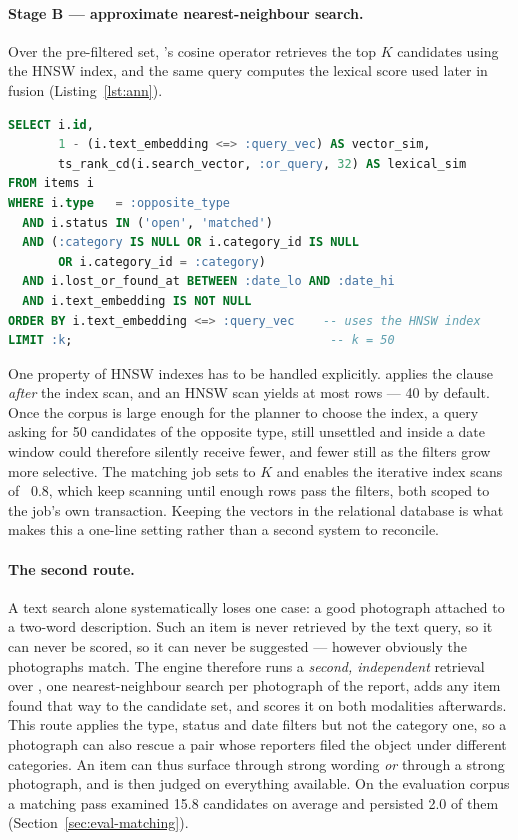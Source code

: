 \paragraph{Stage B --- approximate nearest-neighbour search.} Over the
pre-filtered set, 's cosine operator \code{<=>} retrieves the top
$K$ candidates using the HNSW index, and the same query computes the lexical
score used later in fusion (Listing~\ref{lst:ann}).

\begin{lstlisting}[language=SQL,caption={Candidate retrieval on the text route: filters, vector search and lexical score in one query},label={lst:ann}]
SELECT i.id,
       1 - (i.text_embedding <=> :query_vec) AS vector_sim,
       ts_rank_cd(i.search_vector, :or_query, 32) AS lexical_sim
FROM items i
WHERE i.type   = :opposite_type
  AND i.status IN ('open', 'matched')
  AND (:category IS NULL OR i.category_id IS NULL
       OR i.category_id = :category)
  AND i.lost_or_found_at BETWEEN :date_lo AND :date_hi
  AND i.text_embedding IS NOT NULL
ORDER BY i.text_embedding <=> :query_vec    -- uses the HNSW index
LIMIT :k;                                    -- k = 50
\end{lstlisting}

One property of HNSW indexes has to be handled explicitly. 
applies the  clause \emph{after} the index scan, and an HNSW scan
yields at most  rows --- 40 by default. Once the corpus is
large enough for the planner to choose the index, a query asking for 50
candidates of the opposite type, still unsettled and inside a date window could
therefore silently receive fewer, and fewer still as the filters grow more
selective. The matching job sets  to $K$ and enables the
iterative index scans of ~0.8, which keep scanning until enough
rows pass the filters, both scoped to the job's own transaction. Keeping the
vectors in the relational database is what makes this a one-line setting rather
than a second system to reconcile.

\paragraph{The second route.} A text search alone systematically loses one case:
a good photograph attached to a two-word description. Such an item is never
retrieved by the text query, so it can never be scored, so it can never be
suggested --- however obviously the photographs match. The engine therefore runs
a \emph{second, independent} retrieval over ,
one nearest-neighbour search per photograph of the report, adds any item found
that way to the candidate set, and scores it on both modalities afterwards. This
route applies the type, status and date filters but not the category one, so a
photograph can also rescue a pair whose reporters filed the object under
different categories. An item can thus surface through strong wording \emph{or}
through a strong photograph, and is then judged on everything available. On the
evaluation corpus a matching pass examined 15.8 candidates on average and
persisted 2.0 of them (Section~\ref{sec:eval-matching}).

